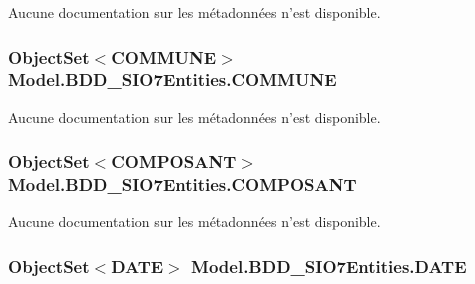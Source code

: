 Aucune documentation sur les métadonnées n'est disponible. 

\hypertarget{class_model_1_1_b_d_d___s_i_o7_entities_abae02e6727c53ad93c03d782dc106fb4}{
\subsubsection[{C\-O\-M\-M\-U\-N\-E}]{\setlength{\rightskip}{0pt plus 5cm}Object\-Set$<${\bf C\-O\-M\-M\-U\-N\-E}$>$ Model.\-B\-D\-D\-\_\-\-S\-I\-O7\-Entities.\-C\-O\-M\-M\-U\-N\-E\hspace{0.3cm}{\ttfamily [get]}}}\label{class_model_1_1_b_d_d___s_i_o7_entities_abae02e6727c53ad93c03d782dc106fb4}


Aucune documentation sur les métadonnées n'est disponible. 

\hypertarget{class_model_1_1_b_d_d___s_i_o7_entities_a5ef1a59c0bb85f597274b5c08a6cf511}{
\subsubsection[{C\-O\-M\-P\-O\-S\-A\-N\-T}]{\setlength{\rightskip}{0pt plus 5cm}Object\-Set$<${\bf C\-O\-M\-P\-O\-S\-A\-N\-T}$>$ Model.\-B\-D\-D\-\_\-\-S\-I\-O7\-Entities.\-C\-O\-M\-P\-O\-S\-A\-N\-T\hspace{0.3cm}{\ttfamily [get]}}}\label{class_model_1_1_b_d_d___s_i_o7_entities_a5ef1a59c0bb85f597274b5c08a6cf511}


Aucune documentation sur les métadonnées n'est disponible. 

\hypertarget{class_model_1_1_b_d_d___s_i_o7_entities_ab13a7822afc52c06d029c60e43d291cf}{
\subsubsection[{D\-A\-T\-E}]{\setlength{\rightskip}{0pt plus 5cm}Object\-Set$<${\bf D\-A\-T\-E}$>$ Model.\-B\-D\-D\-\_\-\-S\-I\-O7\-Entities.\-D\-A\-T\-E\hspace{0.3cm}{\ttfamily [get]}}}\label{class_model_1_1_b_d_d___s_i_o7_entities_ab13a7822afc52c06d029c60e43d291cf}


